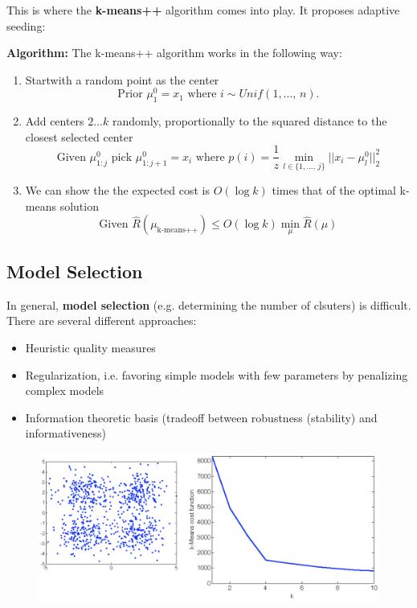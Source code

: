 \documentclass[a4paper]{extarticle}
\begin{document}
This is where the \textbf{k-means++} algorithm comes into play. It proposes adaptive seeding:

\begin{cbox}
    \textbf{Algorithm:} The k-means++ algorithm works in the following way:
    \begin{enumerate}
        \item Startwith a random point as the center
        \[
            \text{Prior } \mu_1^0 = x_1 \text{ where } i \sim Unif(1,..., \, n).
        \]
        \item Add centers $2...k$ randomly, proportionally to the squared distance to the closest selected center
        \[
            \text{Given } \mu_{1:j}^0 \text{ pick } \mu_{1:j+1}^0 = x_i \text{ where } p(i) = \frac{1}{z} \min_{l \in \{1,..., \, j\}}||x_i - \mu_l^0||_2^2
        \]
        \item We can show the the expected cost is $O(\log k)$ times that of the optimal k-means solution
        \[
            \text{Given } \hat{R}(\mu_{\text{k-means++}}) \leq O(\log k) \min_{\mu} \hat{R}(\mu)
        \]
    \end{enumerate}
\end{cbox}

\subsection{Model Selection}

In general, \textbf{model selection} (e.g. determining the number of clsuters) is difficult. There are several different approaches:
\begin{itemize}
    \item Heuristic quality measures
    \item Regularization, i.e. favoring simple models with few parameters by penalizing complex models
    \item Information theoretic basis (tradeoff between robustness (stability) and informativeness)
\end{itemize}

\begin{figure}[H]
    \includegraphics[width=15cm]{../images/IntroML_Fig8-6}
    \centering
\end{figure}
\end{document}
